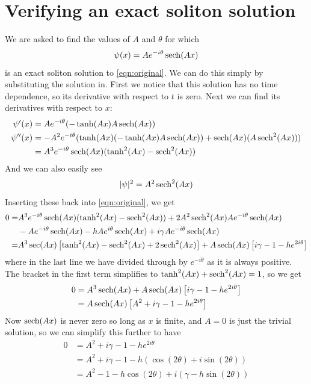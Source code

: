 \documentclass[11pt]{article}
\numberwithin{equation}{section}
\numberwithin{figure}{section}
\numberwithin{table}{section}
\begin{document}
\section{Verifying an exact soliton solution}\label{sec:soliton solution}
\par We are asked to find the values of $A$ and $\theta$ for which 
\begin{equation}
    \psi(x)=Ae^{-i\theta}\sech(Ax)
    \label{eqn:soliton}
\end{equation}
is an exact soliton solution to \cref{eqn:original}. We can do this simply by substituting the solution in. First we notice that this solution has no time dependence, so its derivative with respect to $t$ is zero. Next we can find its derivatives with respect to $x$:
\begin{align*}
    \psi'(x)&=Ae^{-i\theta}(-\tanh(Ax)A\sech(Ax))\\
    \psi''(x)&=-A^2e^{-i\theta}(\tanh(Ax)(-\tanh(Ax)A\sech(Ax))+\sech(Ax)(A\sech^2(Ax)))\\
    &=A^3e^{-i\theta}\sech(Ax)(\tanh^2(Ax)-\sech^2(Ax))
\end{align*}
And we can also easily see
\begin{equation*}
    |\psi|^2=A^2\sech^2(Ax)
\end{equation*}
Inserting these back into \cref{eqn:original}, we get
\begin{align*}
    0=&A^3e^{-i\theta}\sech(Ax)(\tanh^2(Ax)-\sech^2(Ax))+2A^2\sech^2(Ax)Ae^{-i\theta}\sech(Ax)\\ &-Ae^{-i\theta}\sech(Ax)-hAe^{i\theta}\sech(Ax)+i\gamma Ae^{-i\theta}\sech(Ax)\\
    =&A^3\sec(Ax)\left[\tanh^2(Ax)-\sech^2(Ax)+2\sech^2(Ax)\right]+A\sech(Ax)\left[i\gamma-1-he^{2i\theta}\right]
\end{align*}
where in the last line we have divided through by $e^{-i\theta}$ as it is always positive. The bracket in the first term simplifies to $\tanh^2(Ax)+\sech^2(Ax)=1$, so we get
\begin{align*}
    0&=A^3\sech(Ax)+A\sech(Ax)\left[i\gamma-1-he^{2i\theta}\right]\\
    &=A\sech(Ax)\left[A^2+i\gamma-1-he^{2i\theta}\right]
\end{align*}
Now $\sech(Ax)$ is never zero so long as $x$ is finite, and $A=0$ is just the trivial solution, so we can simplify this further to have
\begin{align*}
    0&=A^2+i\gamma-1-he^{2i\theta}\\
    &=A^2+i\gamma-1-h(\cos(2\theta)+i\sin(2\theta))\\
    &=A^2-1-h\cos(2\theta)+i(\gamma-h\sin(2\theta))
\end{align*}
\end{document}
